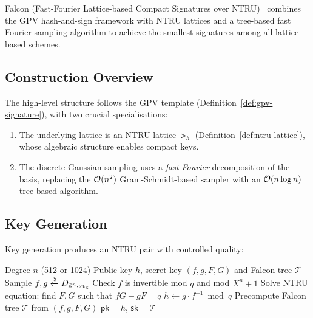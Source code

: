 Falcon (Fast-Fourier Lattice-based Compact Signatures over NTRU)~\cite{Falcon2020} combines the GPV hash-and-sign framework with NTRU lattices and a tree-based fast Fourier sampling algorithm to achieve the smallest signatures among all lattice-based schemes.

\subsection{Construction Overview}
\label{subsec:falcon-overview}

The high-level structure follows the GPV template (Definition~\ref{def:gpv-signature}), with two crucial specialisations:

\begin{enumerate}
\item The underlying lattice is an NTRU lattice $\lat_h$ (Definition~\ref{def:ntru-lattice}), whose algebraic structure enables compact keys.
\item The discrete Gaussian sampling uses a \emph{fast Fourier} decomposition of the basis, replacing the $\mathcal{O}(n^2)$ Gram-Schmidt-based sampler with an $\mathcal{O}(n \log n)$ tree-based algorithm.
\end{enumerate}

\subsection{Key Generation}
\label{subsec:falcon-keygen}

Key generation produces an NTRU pair with controlled quality:

\begin{algorithm}[t]
\caption{Falcon $\KeyGen$}
\label{alg:falcon-keygen}
\begin{algorithmic}[1]
\Require Degree $n$ (512 or 1024)
\Ensure Public key $h$, secret key $(f, g, F, G)$ and Falcon tree $\mathcal{T}$
\Repeat
  \State Sample $f, g \getsr D_{\Z^n, \sigma_{\mathrm{kg}}}$ 
  \State Check $f$ is invertible mod $q$ and mod $X^n + 1$
  \State Solve NTRU equation: find $F, G$ such that $fG - gF = q$
\State $h \gets g \cdot f^{-1} \bmod q$
\State Precompute Falcon tree $\mathcal{T}$ from $(f, g, F, G)$ 
\State \Return $\mathsf{pk} = h$, $\mathsf{sk} = \mathcal{T}$
\end{algorithmic}
\end{algorithm}

